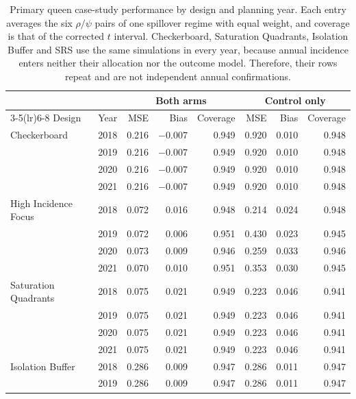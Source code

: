 \documentclass[11pt]{article}
\begin{document}
\begin{table}[!htb]
\footnotesize
\centering

\caption{Primary queen case-study performance by design and planning year. Each entry averages the six $\rho/\psi$ pairs of one spillover regime with equal weight, and coverage is that of the corrected $t$ interval. Checkerboard, Saturation Quadrants, Isolation Buffer and SRS use the same simulations in every year, because annual incidence enters neither their allocation nor the outcome model. Therefore, their rows repeat and are not independent annual confirmations.}
\label{tab:nc-annual}

\begin{tabular}{llrrrrrr}
\toprule
& & \multicolumn{3}{c}{Both arms} & \multicolumn{3}{c}{Control only} \\
\cmidrule(lr){3-5}\cmidrule(lr){6-8}
Design & Year & MSE & Bias & Coverage & MSE & Bias & Coverage \\
\midrule
Checkerboard & 2018 & 0.216 & $-0.007$ & 0.949 & 0.920 & 0.010 & 0.948 \\
 & 2019 & 0.216 & $-0.007$ & 0.949 & 0.920 & 0.010 & 0.948 \\
 & 2020 & 0.216 & $-0.007$ & 0.949 & 0.920 & 0.010 & 0.948 \\
 & 2021 & 0.216 & $-0.007$ & 0.949 & 0.920 & 0.010 & 0.948 \\
\addlinespace
High Incidence Focus & 2018 & 0.072 & 0.016 & 0.948 & 0.214 & 0.024 & 0.948 \\
 & 2019 & 0.072 & 0.006 & 0.951 & 0.430 & 0.023 & 0.945 \\
 & 2020 & 0.073 & 0.009 & 0.946 & 0.259 & 0.033 & 0.946 \\
 & 2021 & 0.070 & 0.010 & 0.951 & 0.353 & 0.030 & 0.945 \\
\addlinespace
Saturation Quadrants & 2018 & 0.075 & 0.021 & 0.949 & 0.223 & 0.046 & 0.941 \\
 & 2019 & 0.075 & 0.021 & 0.949 & 0.223 & 0.046 & 0.941 \\
 & 2020 & 0.075 & 0.021 & 0.949 & 0.223 & 0.046 & 0.941 \\
 & 2021 & 0.075 & 0.021 & 0.949 & 0.223 & 0.046 & 0.941 \\
\addlinespace
Isolation Buffer & 2018 & 0.286 & 0.009 & 0.947 & 0.286 & 0.011 & 0.947 \\
 & 2019 & 0.286 & 0.009 & 0.947 & 0.286 & 0.011 & 0.947 \\

\end{tabular}
\end{table}
\end{document}
